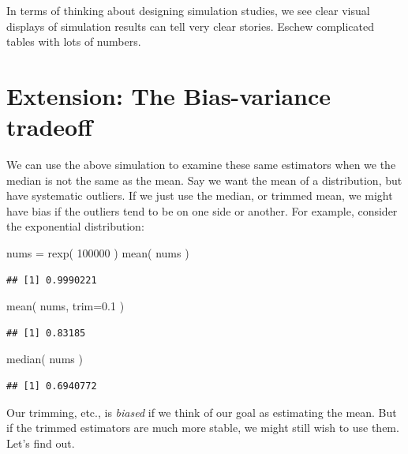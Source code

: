 \documentclass[
]{book}
\newenvironment{Shaded}{\begin{snugshade}}{\end{snugshade}}
\newcommand{\AttributeTok}[1]{\textcolor[rgb]{0.77,0.63,0.00}{#1}}
\newcommand{\DecValTok}[1]{\textcolor[rgb]{0.00,0.00,0.81}{#1}}
\newcommand{\FloatTok}[1]{\textcolor[rgb]{0.00,0.00,0.81}{#1}}
\newcommand{\FunctionTok}[1]{\textcolor[rgb]{0.00,0.00,0.00}{#1}}
\newcommand{\NormalTok}[1]{#1}
\newcommand{\OtherTok}[1]{\textcolor[rgb]{0.56,0.35,0.01}{#1}}
\begin{document}
In terms of thinking about designing simulation studies, we see clear
visual displays of simulation results can tell very clear stories. Eschew
complicated tables with lots of numbers.

\hypertarget{extension-the-bias-variance-tradeoff}{%
\section{Extension: The Bias-variance tradeoff}\label{extension-the-bias-variance-tradeoff}}

We can use the above simulation to examine these same estimators when we the
median is not the same as the mean. Say we want the mean of a distribution,
but have systematic outliers. If we just use the median, or trimmed mean, we
might have bias if the outliers tend to be on one side or another. For
example, consider the exponential distribution:

\begin{Shaded}
\begin{Highlighting}[]
\NormalTok{nums }\OtherTok{=} \FunctionTok{rexp}\NormalTok{( }\DecValTok{100000}\NormalTok{ )}
\FunctionTok{mean}\NormalTok{( nums )}
\end{Highlighting}
\end{Shaded}

\begin{verbatim}
## [1] 0.9990221
\end{verbatim}

\begin{Shaded}
\begin{Highlighting}[]
\FunctionTok{mean}\NormalTok{( nums, }\AttributeTok{trim=}\FloatTok{0.1}\NormalTok{ )}
\end{Highlighting}
\end{Shaded}

\begin{verbatim}
## [1] 0.83185
\end{verbatim}

\begin{Shaded}
\begin{Highlighting}[]
\FunctionTok{median}\NormalTok{( nums )}
\end{Highlighting}
\end{Shaded}

\begin{verbatim}
## [1] 0.6940772
\end{verbatim}

Our trimming, etc., is \emph{biased} if we think of our goal as estimating the
mean. But if the trimmed estimators are much more stable, we might still
wish to use them. Let's find out.
\end{document}
